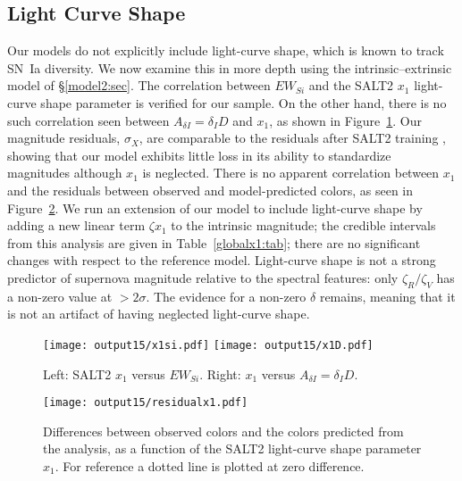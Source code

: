 \documentclass{aastex61}   	%
\begin{document}
\subsection{Light Curve Shape}
Our models do not explicitly include light-curve shape, which is known to track SN~Ia diversity.
We now examine this in more depth using the intrinsic--extrinsic model of \S\ref{model2:sec}.
The correlation between $EW_{Si}$ and the SALT2 $x_1$ light-curve shape parameter is verified
for our sample.
On the other hand, there is no such correlation seen between $A_{\delta I} = \delta_I D$ and $x_1$, as shown in Figure~\ref{x1:fig}. 
Our magnitude residuals, $\sigma_X$, are comparable to the residuals after SALT2 training
\citep{2010A&A...523A...7G}, showing that our model exhibits little loss in its ability to standardize
magnitudes although $x_1$ is neglected.
There is no apparent correlation
between $x_1$ and the residuals between observed and model-predicted colors, as seen in
Figure~\ref{x1res:fig}. 
We  run an extension of our model to include light-curve shape by adding a new linear term $\zeta x_1$ to the 
intrinsic magnitude; the credible intervals
from this analysis are given in Table~\ref{globalx1:tab}; there are no significant changes with respect to the reference model. 
Light-curve shape is not a strong predictor of supernova magnitude relative to the spectral features: only $\zeta_R/\zeta_V$
has a non-zero value at $>2\sigma$.
The evidence for a non-zero $\delta$ remains, meaning that it is not an artifact of
having neglected light-curve shape.

\begin{figure}[htbp] %
   \centering
   \texttt{[image: output15/x1si.pdf]}
   \texttt{[image: output15/x1D.pdf]}
    \caption{Left: SALT2 $x_1$ versus $EW_{Si}$.  Right: $x_1$ versus $A_{\delta I}  = \delta_I D$.
   \label{x1:fig}}
\end{figure}


\begin{figure}[htbp] %
   \centering
   \texttt{[image: output15/residualx1.pdf]}
    \caption{Differences between observed colors and the colors predicted from the analysis, as a function
            of the SALT2 light-curve shape parameter $x_1$.  For reference a dotted line is plotted at zero difference.
   \label{x1res:fig}}
\end{figure}
\end{document}
